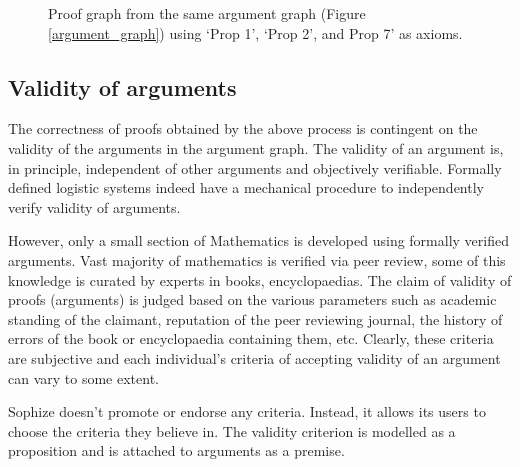 \documentclass[a4paper]{article}
\begin{document}
\begin{figure}[htbp]
\begin{center}
\caption{Proof graph from the same argument graph (Figure \ref{argument_graph}) using `Prop 1', `Prop 2', and Prop 7' as axioms.}
\label{proof_graph2}
\end{center}
\end{figure}

\subsection{Validity of arguments}

The correctness of proofs obtained by the above process is contingent on the validity of the arguments in the argument graph. The validity of an argument is, in principle, independent of other arguments and objectively verifiable. Formally defined logistic systems indeed have a mechanical procedure to independently verify validity of arguments.

However, only a small section of Mathematics is developed using formally verified arguments. Vast majority of mathematics is verified via peer review, some of this knowledge is curated by experts in books, encyclopaedias. The claim of validity of proofs (arguments) is judged based on the various parameters such as academic standing of the claimant, reputation of the peer reviewing journal, the history of errors of the book or encyclopaedia containing them, etc. Clearly, these criteria are subjective and each individual's criteria of accepting validity of an argument can vary to some extent.

Sophize doesn't promote or endorse any criteria. Instead, it allows its users to choose the criteria they believe in. The validity criterion is modelled as a proposition and is attached to arguments as a premise. 
\end{document}

